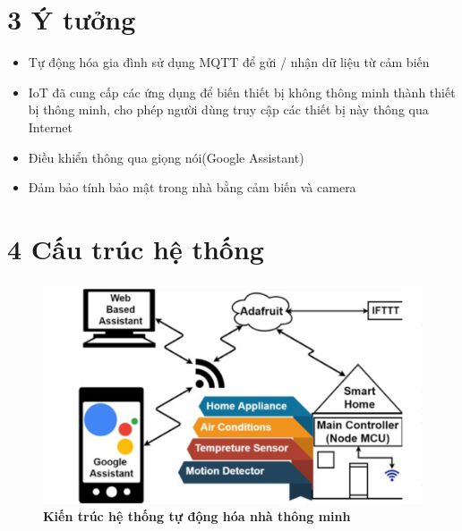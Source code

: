 \documentclass[11pt]{beamer}
\renewcommand{\label}[1]{%
			\gdef\sfname{sf:##1}}%
\begin{document}
\section{3 Ý tưởng}
\label{section3}

\begin{frame}[c]{}
	\begin{itemize}
		\setlength\itemsep{1.5em}
		
		\item{Tự động hóa gia đình sử dụng MQTT để gửi / nhận dữ liệu từ cảm biến}
		
		\item{IoT đã cung cấp các ứng dụng để biến thiết bị không thông minh thành thiết bị thông minh, cho phép người dùng truy cập các thiết bị này thông qua Internet}
		
		\item{Điều khiển thông qua giọng nói(Google Assistant)}

		\item{Đảm bảo tính bảo mật trong nhà bằng cảm biến và camera}
	
	\end{itemize}
\end{frame}

\section{4 Cấu trúc hệ thống}
\label{section4}

\begin{frame}[c]{}
	
	\begin{figure}[h]
		\includegraphics[width=1\textwidth]{Image/Fig. 1 Structure.png}
		\caption{\centering \textbf{Kiến trúc hệ thống tự động hóa nhà thông minh}}
	\end{figure}

\end{frame}
\end{document}

